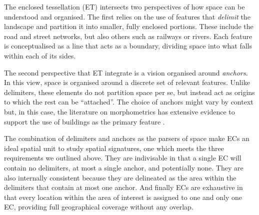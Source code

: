The enclosed tessellation (ET) intersects two perspectives of how space can be
understood and organised.
%
The first relies on the use of features that \textit{delimit} the landscape and
partition it into smaller, fully enclosed portions. These include the road and
street networks, but also others such as railways or rivers. Each feature is
conceptualised as a line that acts as a boundary, dividing space into what falls
within each of its sides.

The second perspective that ET integrate is a vision organised around
\textit{anchors}. In this view, space is organised around
a discrete set of relevant features. Unlike delimiters, these elements do not
partition space per se, but instead act as origins to which the rest can be
``attached''.
%
The choice of anchors might vary by context but, in this case, the literature on
morphometrics has extensive evidence to support the use of buildings as the
primary feature \citep{hamaina2012a, usui2013estimation, schirmer2015}.


The combination of delimiters and anchors as the parsers of space make ECs an
ideal spatial unit to study spatial signatures, one which
meets the three requirements we outlined above.
%
They are indivisable in that a single EC will contain no delimiters, at most a
single anchor, and potentially none.
%
They are also internally consistent because they are delineated as the area
within the delimiters that contain at most one anchor.
%
And finally ECs are exhaustive in that every location within the area of
interest is assigned to one and only one EC, providing full geographical
coverage without any overlap.
